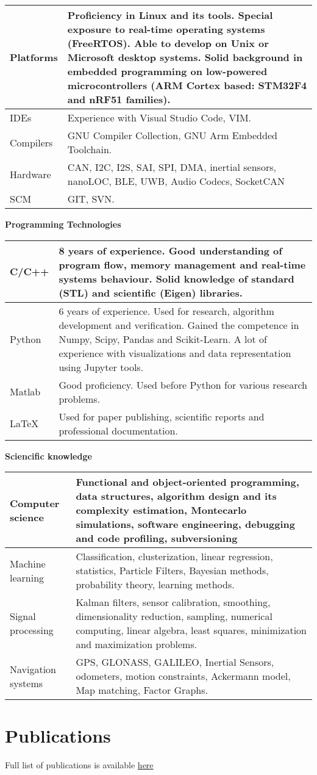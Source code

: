 \documentclass{tccv}
\begin{document}
\begin{supertabular}{ p{4.0cm} | p{12.5cm} }
  Platforms & Proficiency in Linux and its tools. Special exposure to real-time operating systems (FreeRTOS). Able to develop on Unix or Microsoft desktop systems. Solid background in embedded programming on low-powered microcontrollers (ARM Cortex based: STM32F4 and nRF51 families). \\\hline
  IDEs & Experience with Visual Studio Code, VIM.  \\\hline
  Compilers & GNU Compiler Collection, GNU Arm Embedded Toolchain.  \\\hline
  Hardware & CAN, I2C, I2S, SAI, SPI, DMA, inertial sensors, nanoLOC, BLE, UWB, Audio Codecs, SocketCAN\\\hline
  SCM & GIT, SVN. \\
\end{supertabular}

\vspace{2em}
{\large{\textbf{Programming Technologies}}}
\vspace{1em}

\begin{supertabular}{ p{4.0cm} | p{12.5cm} }
  C/C++ & 8 years of experience. Good understanding of program flow, memory management and real-time systems behaviour. Solid knowledge of standard (STL) and scientific (Eigen) libraries. \\\hline
  Python & 6 years of experience. Used for research, algorithm development and verification. Gained the competence in Numpy, Scipy, Pandas and Scikit-Learn. A lot of experience with visualizations and data representation using Jupyter tools.  \\\hline
  Matlab & Good proficiency. Used before Python for various research problems.  \\\hline
  \LaTeX & Used for paper publishing, scientific reports and professional documentation. \\
\end{supertabular}

\vspace{2em}
{\large{\textbf{Sciencific knowledge}}}
\vspace{1em}

\begin{supertabular}{ p{4.0cm} | p{12.5cm} }
  Computer science & Functional and object-oriented programming, data structures, algorithm design and its complexity estimation, Montecarlo simulations, software engineering, debugging and code profiling, subversioning \\\hline
  Machine learning & Classification, clusterization, linear regression, statistics, Particle Filters, Bayesian methods, probability theory, learning methods.  \\\hline
  Signal processing & Kalman filters, sensor calibration, smoothing, dimensionality reduction, sampling, numerical computing, linear algebra, least squares, minimization and maximization problems.  \\\hline
  Navigation systems & GPS, GLONASS, GALILEO, Inertial Sensors, odometers, motion constraints, Ackermann model, Map matching, Factor Graphs. \\
\end{supertabular}

\section{Publications}
Full list of publications is available \href{https://scholar.google.ru/citations?user=skjYlgkAAAAJ}{here}
\end{document}
